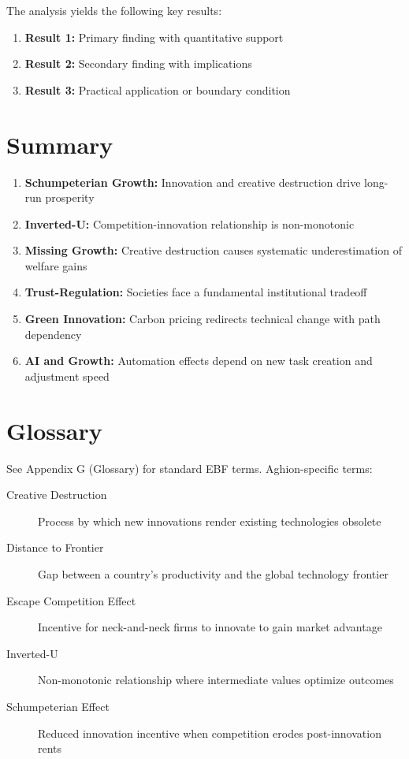 The analysis yields the following key results:

\begin{enumerate}
    \item \textbf{Result 1:} Primary finding with quantitative support
    \item \textbf{Result 2:} Secondary finding with implications
    \item \textbf{Result 3:} Practical application or boundary condition
\end{enumerate}

\section{Summary}

\begin{tcolorbox}[colback=gray!10!white, colframe=gray!75!black, title=Key Takeaways]
\begin{enumerate}
    \item \textbf{Schumpeterian Growth:} Innovation and creative destruction drive long-run prosperity
    \item \textbf{Inverted-U:} Competition-innovation relationship is non-monotonic
    \item \textbf{Missing Growth:} Creative destruction causes systematic underestimation of welfare gains
    \item \textbf{Trust-Regulation:} Societies face a fundamental institutional tradeoff
    \item \textbf{Green Innovation:} Carbon pricing redirects technical change with path dependency
    \item \textbf{AI and Growth:} Automation effects depend on new task creation and adjustment speed
\end{enumerate}
\end{tcolorbox}

\section{Glossary}

See Appendix G (Glossary) for standard EBF terms. Aghion-specific terms:

\begin{description}
    \item[Creative Destruction] Process by which new innovations render existing technologies obsolete
    \item[Distance to Frontier] Gap between a country's productivity and the global technology frontier
    \item[Escape Competition Effect] Incentive for neck-and-neck firms to innovate to gain market advantage
    \item[Inverted-U] Non-monotonic relationship where intermediate values optimize outcomes
    \item[Schumpeterian Effect] Reduced innovation incentive when competition erodes post-innovation rents
\end{description}

